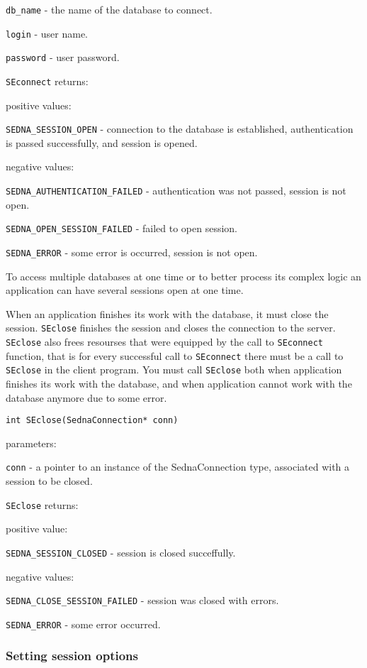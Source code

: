 \documentclass[a4paper,12pt]{article}
\begin{document}
\verb!db_name! -  the name of the database to connect.

\verb!login! - user name.

\verb!password! - user password.

\verb!SEconnect! returns:

positive values:

\verb!SEDNA_SESSION_OPEN! - connection to the database is established, authentication is passed successfully, and session is opened.

negative values:

\verb!SEDNA_AUTHENTICATION_FAILED! - authentication was not passed, session is not open.

\verb!SEDNA_OPEN_SESSION_FAILED! - failed to open session.

\verb!SEDNA_ERROR! - some error is occurred, session is not open.


To access multiple databases at one time or to better process its complex logic an application can have several sessions open at one time.

When an application finishes its work with the database, it must close the session. \verb!SEclose! finishes the session and closes the connection to the server. \verb!SEclose! also frees resourses that were equipped by the call to \verb!SEconnect! function, that is for every successful call to \verb!SEconnect! there must be a call to \verb!SEclose! in the client program. You must call \verb!SEclose! both when application finishes its work with the database, and when application cannot work with the database anymore due to some error.

\begin{verbatim}int SEclose(SednaConnection* conn)\end{verbatim}

parameters:

\verb!conn! - a pointer to an instance of the SednaConnection type, associated with a session to be closed.

\verb!SEclose! returns:

positive value:

\verb!SEDNA_SESSION_CLOSED! - session is closed succeffully.

negative values:

\verb!SEDNA_CLOSE_SESSION_FAILED! - session was closed with errors.

\verb!SEDNA_ERROR! - some error occurred.

\subsubsection{Setting session options}
\label{session-option-capi}
\end{document}
